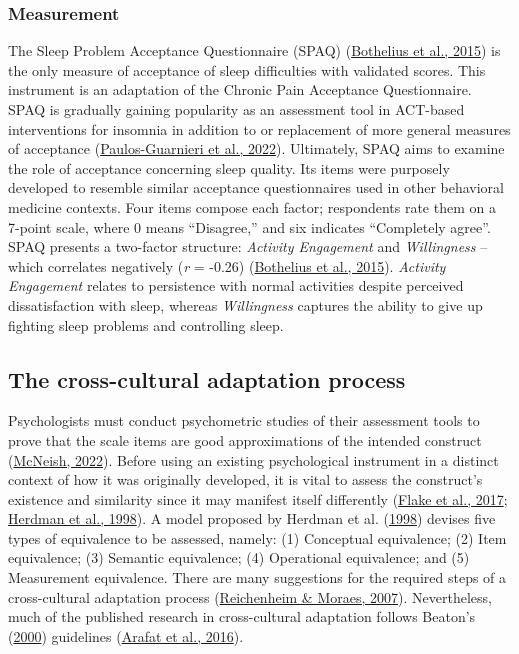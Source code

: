\documentclass[
  ,doc,11pt, twoside,floatsintext]{apa6}
\begin{document}
\hypertarget{measurement-1}{%
\subsubsection{Measurement}\label{measurement-1}}

The Sleep Problem Acceptance Questionnaire (SPAQ) (\protect\hyperlink{ref-bothelius2015}{Bothelius et al., 2015}) is the only measure of acceptance of sleep difficulties with validated scores. This instrument is an adaptation of the Chronic Pain Acceptance Questionnaire. SPAQ is gradually gaining popularity as an assessment tool in ACT-based interventions for insomnia in addition to or replacement of more general measures of acceptance (\protect\hyperlink{ref-paulos-guarnieri2022}{Paulos-Guarnieri et al., 2022}). Ultimately, SPAQ aims to examine the role of acceptance concerning sleep quality. Its items were purposely developed to resemble similar acceptance questionnaires used in other behavioral medicine contexts. Four items compose each factor; respondents rate them on a 7-point scale, where 0 means ``Disagree,'' and six indicates ``Completely agree''. SPAQ presents a two-factor structure: \emph{Activity Engagement} and \emph{Willingness} -- which correlates negatively (\emph{r} = -0.26) (\protect\hyperlink{ref-bothelius2015}{Bothelius et al., 2015}). \emph{Activity Engagement} relates to persistence with normal activities despite perceived dissatisfaction with sleep, whereas \emph{Willingness} captures the ability to give up fighting sleep problems and controlling sleep.

\hypertarget{the-cross-cultural-adaptation-process}{%
\subsection{The cross-cultural adaptation process}\label{the-cross-cultural-adaptation-process}}

Psychologists must conduct psychometric studies of their assessment tools to prove that the scale items are good approximations of the intended construct (\protect\hyperlink{ref-mcneish2022a}{McNeish, 2022}). Before using an existing psychological instrument in a distinct context of how it was originally developed, it is vital to assess the construct's existence and similarity since it may manifest itself differently (\protect\hyperlink{ref-flakeConstructValidationSocial2017}{Flake et al., 2017}; \protect\hyperlink{ref-herdmanModelEquivalenceCultural1998}{Herdman et al., 1998}). A model proposed by Herdman et al. (\protect\hyperlink{ref-herdmanModelEquivalenceCultural1998}{1998}) devises five types of equivalence to be assessed, namely: (1) Conceptual equivalence; (2) Item equivalence; (3) Semantic equivalence; (4) Operational equivalence; and (5) Measurement equivalence. There are many suggestions for the required steps of a cross-cultural adaptation process (\protect\hyperlink{ref-reichenheim2007}{Reichenheim \& Moraes, 2007}). Nevertheless, much of the published research in cross-cultural adaptation follows Beaton's (\protect\hyperlink{ref-beaton2000}{2000}) guidelines (\protect\hyperlink{ref-arafat2016}{Arafat et al., 2016}).
\end{document}

